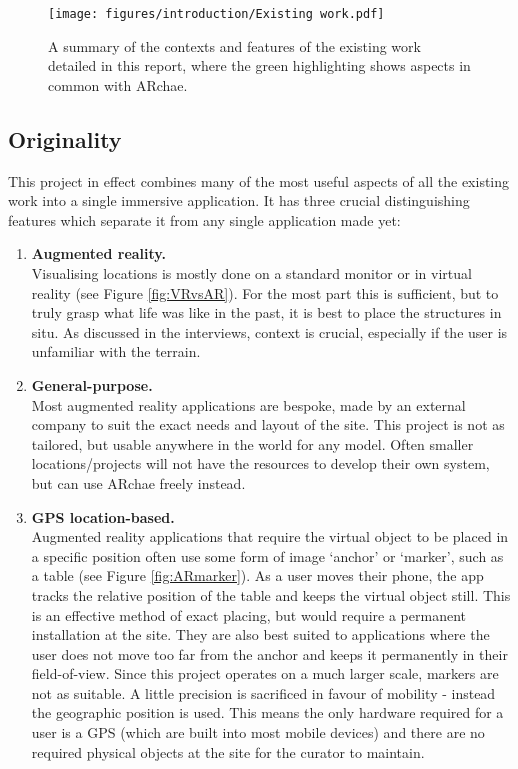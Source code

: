 \documentclass[12pt, a4paper]{article}
\begin{document}
\begin{figure}[H]
    \centering
    \texttt{[image: figures/introduction/Existing work.pdf]}
    \caption{A summary of the contexts and features of the existing work detailed in this report, where the green highlighting shows aspects in common with ARchae.}
    \label{fig:existingwork}
\end{figure}

\subsection{Originality}
This project in effect combines many of the most useful aspects of all the existing work into a single immersive application. It has three crucial distinguishing features which separate it from any single application made yet:
\begin{enumerate}
    \item \textbf{Augmented reality.} \\
    Visualising locations is mostly done on a standard monitor or in virtual reality (see Figure \ref{fig:VRvsAR}). For the most part this is sufficient, but to truly grasp what life was like in the past, it is best to place the structures in situ. As discussed in the interviews, context is crucial, especially if the user is unfamiliar with the terrain.
    \item \textbf{General-purpose.} \\
    Most augmented reality applications are bespoke, made by an external company to suit the exact needs and layout of the site. This project is not as tailored, but usable anywhere in the world for any model. Often smaller locations/projects will not have the resources to develop their own system, but can use ARchae freely instead.
    \item \textbf{GPS location-based.} \\
    Augmented reality applications that require the virtual object to be placed in a specific position often use some form of image `anchor' or `marker', such as a table (see Figure \ref{fig:ARmarker}). As a user moves their phone, the app tracks the relative position of the table and keeps the virtual object still. This is an effective method of exact placing, but would require a permanent installation at the site. They are also best suited to applications where the user does not move too far from the anchor and keeps it permanently in their field-of-view. Since this project operates on a much larger scale, markers are not as suitable. A little precision is sacrificed in favour of mobility - instead the geographic position is used. This means the only hardware required for a user is a GPS (which are built into most mobile devices) and there are no required physical objects at the site for the curator to maintain. 
\end{enumerate}
\end{document}
